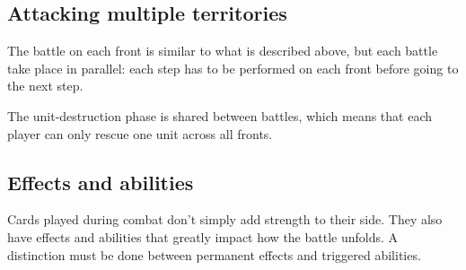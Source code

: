 \documentclass[a4paper]{article}
\begin{document}
  \subsection{Attacking multiple territories}
    
    The battle on each front is similar to what is described above,
    but each battle take place in parallel:
    each step has to be performed on each front before going to the next step.
    
    The unit-destruction phase is shared between battles, which means that
    each player can only rescue one unit across all fronts.


\newpage
\subsection{Effects and abilities}

    Cards played during combat don't simply add strength to their side.
    They also have effects and abilities that greatly impact how the battle unfolds.
    A distinction must be done between permanent effects and triggered abilities.
\end{document}
